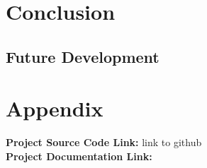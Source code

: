 \chapter{Conclusion}



\section{Future Development}

\chapter{Appendix}

\textbf{Project Source Code Link: }link to github \\
\textbf{Project Documentation Link: } \\

